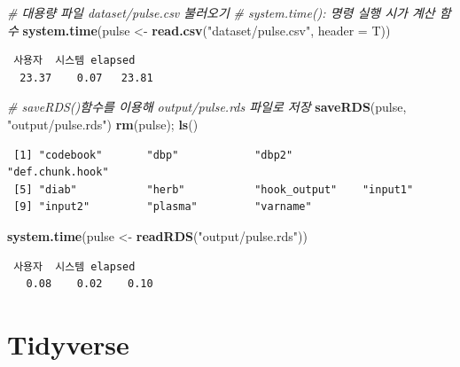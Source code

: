 \documentclass[
  11pt,
]{krantz}
\newenvironment{Shaded}{\begin{snugshade}}{\end{snugshade}}
\newcommand{\CommentTok}[1]{\textcolor[rgb]{0.37,0.37,0.37}{\textit{#1}}}
\newcommand{\DataTypeTok}[1]{\textcolor[rgb]{0.27,0.27,0.27}{#1}}
\newcommand{\KeywordTok}[1]{\textcolor[rgb]{0.27,0.27,0.27}{\textbf{#1}}}
\newcommand{\NormalTok}[1]{#1}
\newcommand{\StringTok}[1]{\textcolor[rgb]{0.5,0.5,0.5}{#1}}
\begin{document}
\footnotesize

\begin{Shaded}
\begin{Highlighting}[]
\CommentTok{# 대용량 파일 dataset/pulse.csv 불러오기}
\CommentTok{# system.time(): 명령 실행 시가 계산 함수}
\KeywordTok{system.time}\NormalTok{(pulse <-}\StringTok{ }\KeywordTok{read.csv}\NormalTok{(}\StringTok{"dataset/pulse.csv"}\NormalTok{, }\DataTypeTok{header =}\NormalTok{ T))}
\end{Highlighting}
\end{Shaded}

\begin{verbatim}
 사용자  시스템 elapsed 
  23.37    0.07   23.81 
\end{verbatim}

\begin{Shaded}
\begin{Highlighting}[]
\CommentTok{# saveRDS()함수를 이용해 output/pulse.rds 파일로 저장}
\KeywordTok{saveRDS}\NormalTok{(pulse, }\StringTok{"output/pulse.rds"}\NormalTok{)}
\KeywordTok{rm}\NormalTok{(pulse); }\KeywordTok{ls}\NormalTok{()}
\end{Highlighting}
\end{Shaded}

\begin{verbatim}
 [1] "codebook"       "dbp"            "dbp2"           "def.chunk.hook"
 [5] "diab"           "herb"           "hook_output"    "input1"        
 [9] "input2"         "plasma"         "varname"       
\end{verbatim}

\begin{Shaded}
\begin{Highlighting}[]
\KeywordTok{system.time}\NormalTok{(pulse <-}\StringTok{ }\KeywordTok{readRDS}\NormalTok{(}\StringTok{"output/pulse.rds"}\NormalTok{))}
\end{Highlighting}
\end{Shaded}

\begin{verbatim}
 사용자  시스템 elapsed 
   0.08    0.02    0.10 
\end{verbatim}

\normalsize

\hypertarget{tidyverse}{%
\section{Tidyverse}\label{tidyverse}}
\end{document}
